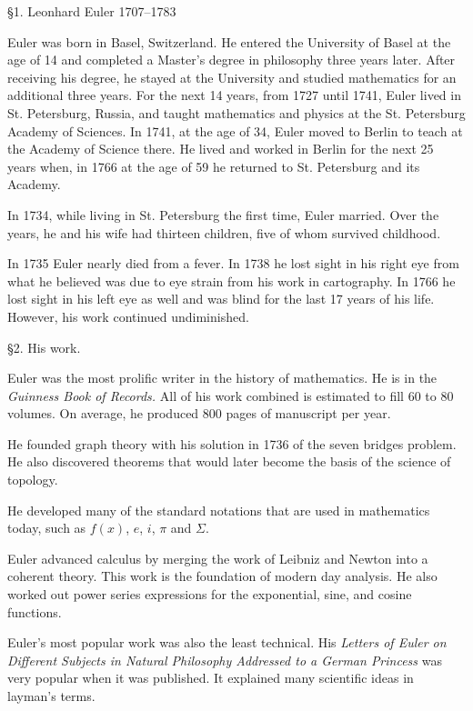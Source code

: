 \item{\S1.} Leonhard Euler 1707--1783

 Euler was born in Basel, Switzerland.
He entered the University of Basel at the age of 14 and completed a
Master's degree in philosophy three years later.
After receiving his degree, he stayed at the University and studied
mathematics for an additional three years.
For the next 14 years, from 1727 until 1741, Euler lived in St. Petersburg,
Russia, and taught mathematics and physics at the
St. Petersburg Academy of Sciences.
In 1741, at the age of 34, Euler moved to Berlin to teach at
the Academy of Science there.
He lived and worked in Berlin for the next 25 years when, in 1766 at the age of 59 he returned
to St. Petersburg and its Academy.

 In 1734, while living in St. Petersburg the first time,
Euler married.
Over the years, he and his wife had thirteen children, five of
whom survived childhood.

 In 1735 Euler nearly died from a fever.
In 1738 he lost sight in his right eye from what he believed
was due to eye strain from his work in cartography.
In 1766 he lost sight in his left eye as well and was
blind for the last 17 years of his life.
However, his work continued undiminished.

\item{\S2.} His work.

 Euler was the most prolific writer in the history of mathematics.
He is in the {\it Guinness Book of Records.}
All of his work combined is estimated to fill 60 to 80 volumes.
On average, he produced 800 pages of manuscript per year.

He founded graph theory with his solution in 1736 of the
seven bridges problem.
He also discovered theorems that would later become the basis
of the science of topology.

He developed many of the standard notations that are used in mathematics today,
such as $f(x)$, $e$, $i$, $\pi$ and $\Sigma$.

Euler advanced calculus by merging the work of Leibniz and Newton into
a coherent theory.
This work is the foundation of modern day analysis.
He also worked out power series expressions for the exponential,
sine, and cosine functions.

Euler's most popular work was also the least technical.
His {\it Letters of Euler on Different Subjects in Natural
Philosophy Addressed to a German Princess} was very popular when
it was published.
It explained many scientific ideas in layman's terms.

